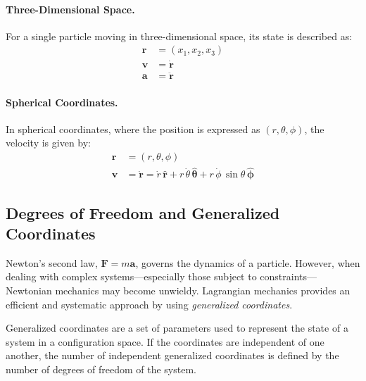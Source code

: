 \paragraph{Three-Dimensional Space.}
For a single particle moving in three-dimensional space, its state is described as:
\begin{equation}
    \begin{aligned}
        \mathbf{r} & = (x_1, x_2, x_3)   \\
        \mathbf{v} & = \dot{\mathbf{r}}  \\
        \mathbf{a} & = \ddot{\mathbf{r}}
    \end{aligned}
\end{equation}

\paragraph{Spherical Coordinates.}
In spherical coordinates, where the position is expressed as $(r,\theta,\phi)$, the velocity is given by:
\begin{equation}
    \begin{aligned}
        \mathbf{r} & = (r,\theta,\phi) \\
        \mathbf{v} & = \dot{\mathbf{r}} = \dot{r}\,\hat{\mathbf{r}} + r\,\dot{\theta}\,\hat{\boldsymbol{\theta}} + r\,\dot{\phi}\,\sin\theta\,\hat{\boldsymbol{\phi}}
    \end{aligned}
\end{equation}

\subsection{Degrees of Freedom and Generalized Coordinates}

Newton's second law, $\mathbf{F} = m\mathbf{a}$, governs the dynamics of a particle. However, when dealing with complex systems—especially those subject to constraints—Newtonian mechanics may become unwieldy. Lagrangian mechanics provides an efficient and systematic approach by using \emph{generalized coordinates}.

\begin{definition}
    Generalized coordinates are a set of parameters used to represent the state of a system in a configuration space.  If the coordinates are independent of one another, the number of independent generalized coordinates is defined by the number of degrees of freedom of the system.
\end{definition}

